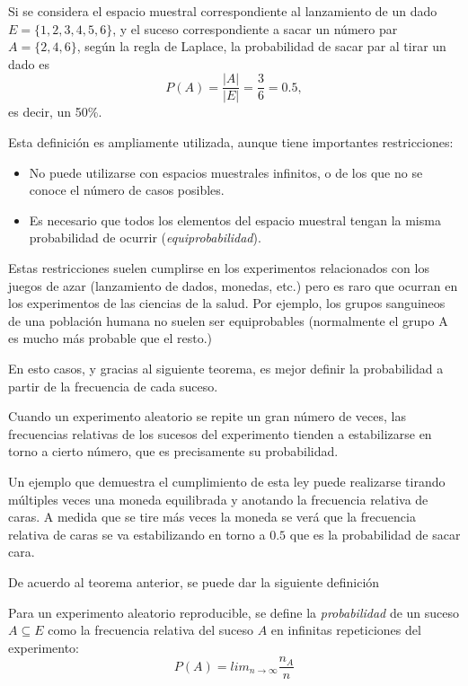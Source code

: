 \begin{ejemplo}
Si se considera el espacio muestral correspondiente al lanzamiento de un dado $E=\{1,2,3,4,5,6\}$, y el suceso correspondiente a sacar un
número par $A=\{2,4,6\}$, según la regla de Laplace, la probabilidad de sacar par al tirar un dado es
\[P(A)=\frac{|A|}{|E|}=\frac{3}{6}=0.5,\]
es decir, un 50\%. 
\end{ejemplo}

Esta definición es ampliamente utilizada, aunque tiene importantes restricciones:
\begin{itemize}[label=--]
\item No puede utilizarse con espacios muestrales infinitos, o de los que no se conoce el número de casos posibles.
\item Es necesario que todos los elementos del espacio muestral tengan la misma probabilidad de ocurrir (\emph{equiprobabilidad}).  
\end{itemize}

Estas restricciones suelen cumplirse en los experimentos relacionados con los juegos de azar (lanzamiento de dados, monedas, etc.) pero es
raro que ocurran en los experimentos de las ciencias de la salud.
Por ejemplo, los grupos sanguineos de una población humana no suelen ser equiprobables (normalmente el grupo A es mucho más probable que
el resto.)

En esto casos, y gracias al siguiente teorema, es mejor definir la probabilidad a partir de la frecuencia de cada suceso.

\begin{teorema}
Cuando un experimento aleatorio se repite un gran número de veces, las frecuencias relativas de los sucesos del
experimento tienden a estabilizarse en torno a cierto número, que es precisamente su probabilidad.
\end{teorema}

Un ejemplo que demuestra el cumplimiento de esta ley puede realizarse tirando múltiples veces una moneda equilibrada y anotando la
frecuencia relativa de caras. 
A medida que se tire más veces la moneda se verá que la frecuencia relativa de caras se va estabilizando en torno a $0.5$ que es
la probabilidad de sacar cara. 

De acuerdo al teorema anterior, se puede dar la siguiente definición
\begin{definicion}
Para un experimento aleatorio reproducible, se define la \emph{probabilidad} de un suceso $A\subseteq E $ como la frecuencia relativa del
suceso $A$ en infinitas repeticiones del experimento:
\[ P(A) = lim_{n\rightarrow \infty}\frac{n_{A}}{n}\]
\end{definicion}


